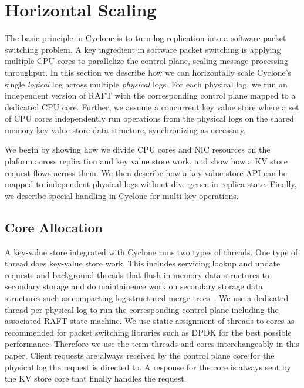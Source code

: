 \documentclass[10pt, preprint, nonatbib]{sigplanconf}
\begin{document}
\section{Horizontal Scaling}
\label{sec:horizontal}
The basic principle in Cyclone is to turn log replication into a software packet
switching problem. A key ingredient in software packet switching is applying
multiple CPU cores to parallelize the control plane, scaling message processing
throughput. In this section we describe how we can horizontally scale Cyclone's
single \emph{logical} log across multiple \emph{physical} logs. For each
physical log, we run an independent version of RAFT with the corresponding
control plane mapped to a dedicated CPU core. Further, we assume a concurrent
key value store where a set of CPU cores independently run operations from the
physical logs on the shared memory key-value store data structure, synchronizing
as necessary.

We begin by showing how we divide CPU cores and NIC resources on the plaform across
replication and key value store work, and show how a KV store request flows
across them.  We then describe how a key-value store API can be mapped to
independent physical logs without divergence in replica state. Finally, we
describe special handling in Cyclone for multi-key operations.

\subsection{Core Allocation}
A key-value store integrated with Cyclone runs two types of threads. One type of
thread does key-value store work. This includes servicing lookup and update
requests and background threads that flush in-memory data structures to
secondary storage and do maintainence work on secondary storage data structures
such as compacting log-structured merge trees~\cite{lsmtree}. We use a dedicated
thread per-physical log to run the corresponding control plane including the
associated RAFT state machine. We use static assignment of threads to cores as
recommended for packet switching libraries such as DPDK for the best possible
performance. Therefore we use the term threads and cores interchangeably in this
paper. Client requests are always received by the control plane core for
the physical log the request is directed to. A response for the core is always
sent by the KV store core that finally handles the request.
\end{document}
